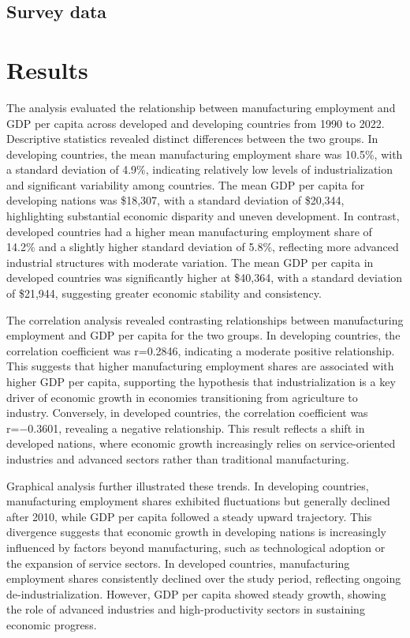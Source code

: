 \documentclass[12pt]{article}
\begin{document}
\subsection{Survey data}

\section{Results}
\label{sec:result}

The analysis evaluated the relationship between manufacturing employment and GDP per capita across developed and developing countries from 1990 to 2022. Descriptive statistics revealed distinct differences between the two groups. In developing countries, the mean manufacturing employment share was 10.5\%, with a standard deviation of 4.9\%, indicating relatively low levels of industrialization and significant variability among countries. The mean GDP per capita for developing nations was \$18,307, with a standard deviation of \$20,344, highlighting substantial economic disparity and uneven development. In contrast, developed countries had a higher mean manufacturing employment share of 14.2\% and a slightly higher standard deviation of 5.8\%, reflecting more advanced industrial structures with moderate variation. The mean GDP per capita in developed countries was significantly higher at \$40,364, with a standard deviation of \$21,944, suggesting greater economic stability and consistency.

The correlation analysis revealed contrasting relationships between manufacturing employment and GDP per capita for the two groups. In developing countries, the correlation coefficient was r=0.2846, indicating a moderate positive relationship. This suggests that higher manufacturing employment shares are associated with higher GDP per capita, supporting the hypothesis that industrialization is a key driver of economic growth in economies transitioning from agriculture to industry. Conversely, in developed countries, the correlation coefficient was r=−0.3601, revealing a negative relationship. This result reflects a shift in developed nations, where economic growth increasingly relies on service-oriented industries and advanced sectors rather than traditional manufacturing.

Graphical analysis further illustrated these trends. In developing countries, manufacturing employment shares exhibited fluctuations but generally declined after 2010, while GDP per capita followed a steady upward trajectory. This divergence suggests that economic growth in developing nations is increasingly influenced by factors beyond manufacturing, such as technological adoption or the expansion of service sectors. In developed countries, manufacturing employment shares consistently declined over the study period, reflecting ongoing de-industrialization. However, GDP per capita showed steady growth, showing the role of advanced industries and high-productivity sectors in sustaining economic progress.
\end{document}
